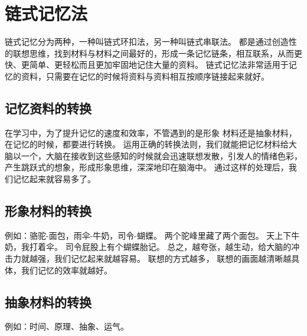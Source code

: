 
\chapter{链式记忆法}

链式记忆分为两种，一种叫链式环扣法，另一种叫链式串联法。
都是通过创造性的联想思维，找到材料与材料之间最好的，形成一条记忆链条，相互联系，从而更快、更简单、更轻松而且更加牢固地记住大量的资料。
链式记忆法非常适用于记忆的资料，只需要在记忆的时候将资料与资料相互按顺序链接起来就好。



\section{记忆资料的转换}

在学习中，为了提升记忆的速度和效率，不管遇到的是形象 材料还是抽象材料，在记忆的时候，都要进行转换。
运用正确的转换法则，我们就能把记忆材料给大脑以一个，大脑在接收到这些感知的时候就会迅速联想发散，引发人的情绪色彩，产生跳跃式的想象，形成形象思维，深深地印在脑海中。
通过这样的处理后，我们记忆起来就容易多了。


\section{形象材料的转换}

例如：骆驼-面包，雨伞-牛奶，司令-蝴蝶。
两个驼峰里藏了两个面包。
天上下牛奶，我打着伞。
司令屁股上有个蝴蝶胎记。
总之，越夸张，越生动，给大脑的冲击力就越强，我们记忆起来就越容易。
联想的方式越多， 联想的画面越清晰越具体，我们记忆的效率就越好。


\section{抽象材料的转换}

例如：时间、原理、抽象、运气。

